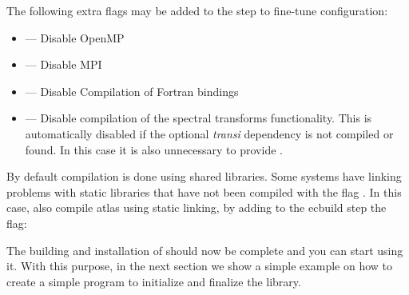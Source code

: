 The following extra flags may be added to the  
step to fine-tune configuration:
\begin{itemize}
\setlength\itemsep{0.1em}
\item {} --- Disable OpenMP
\item {} --- Disable MPI
\item {} --- Disable Compilation of Fortran bindings
\item {} --- Disable compilation of the spectral transforms
       functionality. This is automatically disabled if the optional \emph{transi}
       dependency is not compiled or found. In this case it is also unnecessary to
       provide .
\end{itemize}
%
%
\begin{notebox}
By default compilation is done using shared libraries. Some systems have 
linking problems with static libraries that have not been compiled with 
the flag . In this case, also compile atlas using static 
linking, by adding to the ecbuild step the flag: 
\end{notebox}
%
The building and installation of \Atlas should now be complete 
and you can start using it. With this purpose, in the next 
section we show a simple example on how to create a simple 
program to initialize and finalize the library.


